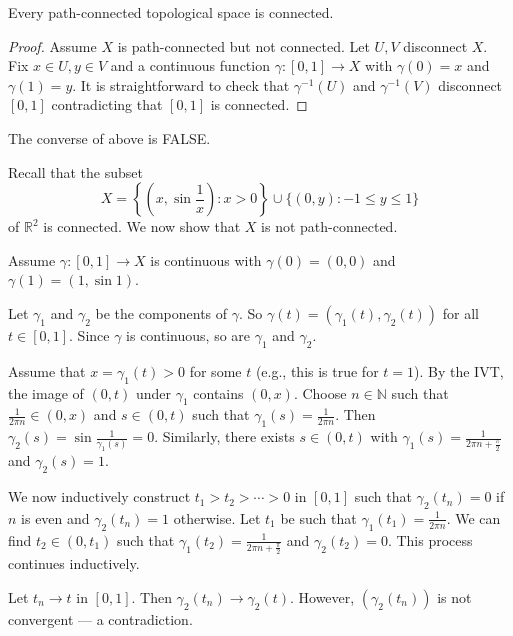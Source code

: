 \documentclass[a4paper]{article}
\begin{document}
\begin{theorem}\label{thm:path connected is connected}
    Every path-connected topological space is connected.
\end{theorem}

\begin{proof}
    Assume $X$ is path-connected but not connected. Let $U, V$ disconnect $X$. Fix $x \in U, y \in V$ and a continuous function $\gamma:[0,1] \rightarrow X$ with $\gamma(0)=x$ and $\gamma(1)=y$. It is straightforward to check that $\gamma^{-1}(U)$ and $\gamma^{-1}(V)$ disconnect $[0,1]$ contradicting that $[0,1]$ is connected.
\end{proof}
The converse of above is FALSE.
\begin{example}
    Recall that the subset
    \[
        X=\left\{\left(x, \sin \frac{1}{x}\right): x>0\right\} \cup\{(0, y):-1 \leqslant y \leqslant 1\}
    \]
    of $\mathbb{R}^{2}$ is connected. We now show that $X$ is not path-connected.

    Assume $\gamma:[0,1] \rightarrow X$ is continuous with $\gamma(0)=(0,0)$ and $\gamma(1)=(1, \sin 1)$.

    Let $\gamma_{1}$ and $\gamma_{2}$ be the components of $\gamma$. So $\gamma(t)=\left(\gamma_{1}(t), \gamma_{2}(t)\right)$ for all $t \in[0,1]$. Since $\gamma$ is continuous, so are $\gamma_{1}$ and $\gamma_{2}$.

    Assume that $x=\gamma_{1}(t)>0$ for some $t$ (e.g., this is true for $t=1$). By the IVT, the image of $(0, t)$ under $\gamma_{1}$ contains $(0, x)$. Choose $n \in \mathbb{N}$ such that $\frac{1}{2 \pi n} \in(0, x)$ and $s \in(0, t)$ such that $\gamma_{1}(s)=\frac{1}{2 \pi n}$. Then $\gamma_{2}(s)=\sin \frac{1}{\gamma_{1}(s)}=0$. Similarly, there exists $s \in(0, t)$ with $\gamma_{1}(s)=\frac{1}{2 \pi n+\frac{\pi}{2}}$ and $\gamma_{2}(s)=1$. 
    
    We now inductively construct $t_{1}>t_{2}>\cdots>0$ in $[0,1]$ such that $\gamma_{2}\left(t_{n}\right)=0$ if $n$ is even and $\gamma_{2}\left(t_{n}\right)=1$ otherwise. 
    Let $t_1$ be such that $ \gamma_1(t_1) = \frac{1}{2\pi n} $. We can find $ t_2 \in (0,t_1) $ such that $ \gamma_1(t_2) =\frac{1}{2\pi n+\frac{\pi}{2} } $ and $\gamma_2(t_2)=0$. This process continues inductively.
    
    Let $t_{n} \rightarrow t$ in $[0,1]$. Then $\gamma_{2}\left(t_{n}\right) \rightarrow \gamma_{2}(t)$. However, $\left(\gamma_{2}\left(t_{n}\right)\right)$ is not convergent --- a contradiction.
\end{example}
\end{document}
